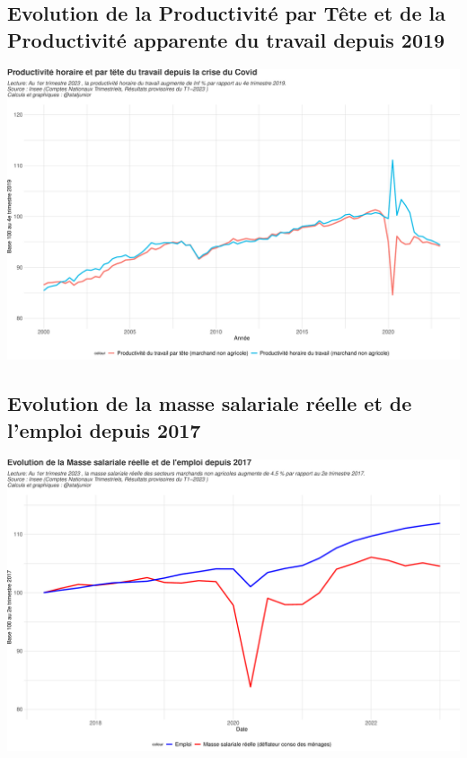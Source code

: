 \documentclass[
  paper=a4,
  ,captions=tableheading
]{scrartcl}
\begin{document}
\hypertarget{evolution-de-la-productivituxe9-par-tuxeate-et-de-la-productivituxe9-apparente-du-travail-depuis-2019}{%
\subsection{Evolution de la Productivité par Tête et de la Productivité
apparente du travail depuis
2019}\label{evolution-de-la-productivituxe9-par-tuxeate-et-de-la-productivituxe9-apparente-du-travail-depuis-2019}}

\includegraphics{rapport_pdf_compte_branche_files/figure-latex/unnamed-chunk-12-1.pdf}

\hypertarget{evolution-de-la-masse-salariale-ruxe9elle-et-de-lemploi-depuis-2017}{%
\subsection{Evolution de la masse salariale réelle et de l'emploi depuis
2017}\label{evolution-de-la-masse-salariale-ruxe9elle-et-de-lemploi-depuis-2017}}

\includegraphics{rapport_pdf_compte_branche_files/figure-latex/unnamed-chunk-13-1.pdf}
\end{document}
